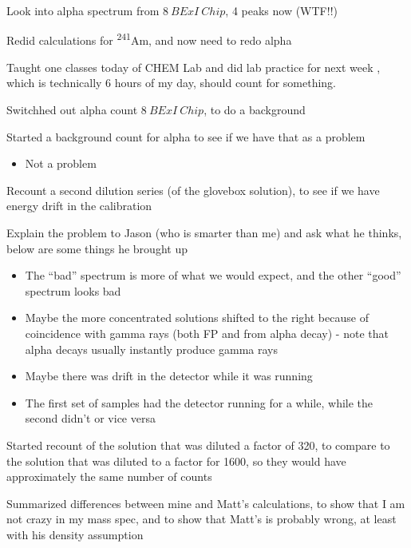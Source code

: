 \documentclass[idxtotoc,hyperref,openany,oneside]{labbook} %
\newcommand{\cmark}{\ding{51}}%
\newcommand{\done}{\rlap{$\square$}{\raisebox{2pt}{\large\hspace{1pt}\cmark}}%
  \hspace{-2.5pt}}
\newcommand{\tss}{\textsuperscript}
\begin{document}
\begin{todolist}
\item[\done]{Look into alpha spectrum from $\boxed{8\ BExI\ Chip}$, 4 peaks now
  (WTF!!)}
\item[\done]{Redid calculations for \tss{241}Am, and now need to redo alpha}
\end{todolist}



Taught one classes today of CHEM Lab and did lab practice for next week
, which is technically 6 hours
of my day, should count for something.






\begin{todolist}
\item[\done]{Switchhed out alpha count $\boxed{8\ BExI\ Chip}$, to do a background}
\item[\done]{Started a background count for alpha to see if we have that as a problem}
  \begin{itemize}
  \item{Not a problem}
  \end{itemize}
\item[\done]{Recount a second dilution series (of the glovebox solution), to
  see if we have energy drift in the calibration}
\item[\done]{Explain the problem to Jason (who is smarter than me) and ask
  what he thinks, below are some things he brought up}
  \begin{itemize}
  \item{The ``bad'' spectrum is more of what we would expect, and the other
    ``good'' spectrum looks bad}
  \item{Maybe the more concentrated solutions shifted to the right because
    of coincidence with gamma rays (both FP and from alpha decay) - note that
    alpha decays usually instantly produce gamma rays}
  \item{Maybe there was drift in the detector while it was running}
  \item{The first set of samples had the detector running for a while, while the second didn't
    or vice versa}
  \end{itemize}
\item[\done]{Started recount of the solution that was diluted a factor of 320,
  to compare to the solution that was diluted to a factor for 1600, so they
  would have approximately the same number of counts}
\item[\done]{Summarized differences between mine and Matt's calculations,
  to show that I am not crazy in my mass spec, and to show that Matt's is probably wrong,
  at least with his density assumption}
\end{todolist}
\end{document}
